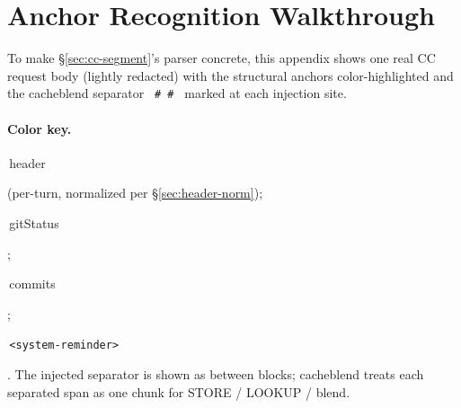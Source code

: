 \section{Anchor Recognition Walkthrough}
\label{app:anchors}

To make \S\ref{sec:cc-segment}'s parser concrete, this appendix shows
one real CC request body (lightly redacted) with the structural
anchors color-highlighted and the cacheblend separator
\texttt{\textquotedbl{}~\#~\#~\textquotedbl{}} marked at each
injection site.


\paragraph{Color key.}
\colorbox{anchorHeader}{\strut\,header\,} (per-turn, normalized
per \S\ref{sec:header-norm});
\colorbox{anchorGit}{\strut\,gitStatus\,};
\colorbox{anchorCommits}{\strut\,commits\,};
\colorbox{anchorReminder}{\strut\,\texttt{<system-reminder>}\,}.
The injected separator is shown as
\fbox{\,\texttt{~\#~\#~}\,} between blocks; cacheblend treats
each separated span as one chunk for STORE / LOOKUP / blend.

